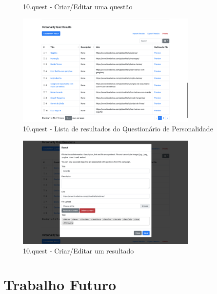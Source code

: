 \begin{figure}[ht!]
\begin{center}
\begin{minipage}{0.45\textwidth}
\begin{center}
				\caption{10.quest - Criar/Editar uma questão}
				\label{fig:pq_q2}
			\end{center}
		\end{minipage}
	\end{center}
\end{figure}

\begin{figure}[ht!]
	\begin{center}
		\includegraphics[width=0.8\textwidth]{img/product/pq_results}
		\caption{10.quest - Lista de resultados do Questionário de Personalidade}
		\label{fig:pq_results}
	\end{center}
\end{figure}

\begin{figure}[ht!]
	\begin{center}
		\includegraphics[width=0.8\textwidth]{img/product/pq_result}
		\caption{10.quest - Criar/Editar um resultado}
		\label{fig:pq_result}
	\end{center}
\end{figure}



\section{Trabalho Futuro}

\blankpage

\glsresetall
